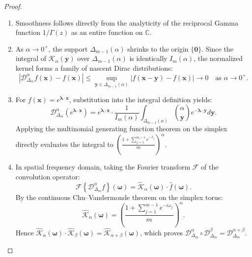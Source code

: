 \documentclass[11pt,a4paper]{article}
\theoremstyle{plain}
\theoremstyle{definition}
\theoremstyle{remark}
\numberwithin{equation}{section}
\begin{document}
\begin{proof}
\leavevmode
\begin{enumerate}
    \item Smoothness follows directly from the analyticity of the reciprocal Gamma function $1/\Gamma(z)$ as an entire function on $\mathbb{C}$.
    \item As $\alpha \to 0^+$, the support $\Delta_{m-1}(\alpha)$ shrinks to the origin $\{\mathbf{0}\}$. Since the integral of $\mathcal{K}_\alpha(\mathbf{y})$ over $\Delta_{m-1}(\alpha)$ is identically $I_m(\alpha)$, the normalized kernel forms a family of nascent Dirac distributions:
    \begin{equation}
    \left|\mathcal{D}_{\Delta_m}^\alpha f(\mathbf{x}) - f(\mathbf{x})\right| \le \sup_{\mathbf{y} \in \Delta_{m-1}(\alpha)} |f(\mathbf{x}-\mathbf{y}) - f(\mathbf{x})| \to 0 \quad \text{as } \alpha \to 0^+.
    \end{equation}
    \item For $f(\mathbf{x}) = e^{\boldsymbol{\lambda}\cdot\mathbf{x}}$, substitution into the integral definition yields:
    \begin{equation}
    \mathcal{D}_{\Delta_m}^\alpha\left(e^{\boldsymbol{\lambda}\cdot\mathbf{x}}\right) = e^{\boldsymbol{\lambda}\cdot\mathbf{x}} \cdot \frac{1}{I_m(\alpha)}\int_{\Delta_{m-1}(\alpha)} \binom{\alpha}{\mathbf{y}} e^{-\boldsymbol{\lambda}\cdot\mathbf{y}}d\mathbf{y}.
    \end{equation}
    Applying the multinomial generating function theorem on the simplex directly evaluates the integral to $\left(\frac{1 + \sum_{j=1}^{m-1}e^{-\lambda_j}}{m}\right)^\alpha$.
    \item In spatial frequency domain, taking the Fourier transform $\mathcal{F}$ of the convolution operator:
    \begin{equation}
    \mathcal{F}\left\{\mathcal{D}_{\Delta_m}^\alpha f\right\}(\boldsymbol{\omega}) = \widehat{\mathcal{K}}_\alpha(\boldsymbol{\omega}) \cdot \widehat{f}(\boldsymbol{\omega}).
    \end{equation}
    By the continuous Chu--Vandermonde theorem on the simplex torus:
    \begin{equation}
    \widehat{\mathcal{K}}_\alpha(\boldsymbol{\omega}) = \left(\frac{1 + \sum_{j=1}^{m-1}e^{-i\omega_j}}{m}\right)^\alpha.
    \end{equation}
    Hence $\widehat{\mathcal{K}}_\alpha(\boldsymbol{\omega}) \cdot \widehat{\mathcal{K}}_\beta(\boldsymbol{\omega}) = \widehat{\mathcal{K}}_{\alpha+\beta}(\boldsymbol{\omega})$, which proves $\mathcal{D}_{\Delta_m}^\alpha \circ \mathcal{D}_{\Delta_m}^\beta = \mathcal{D}_{\Delta_m}^{\alpha+\beta}$.
\end{enumerate}
\end{proof}
\end{document}
